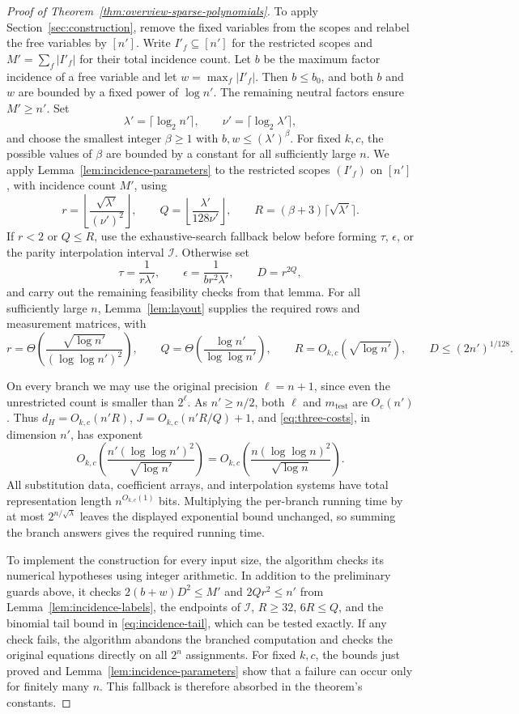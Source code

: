 \documentclass[11pt,reqno]{amsart}
\numberwithin{equation}{section}
\theoremstyle{definition}\newtheorem{definition}[theorem]{Definition}
\theoremstyle{remark}\newtheorem{remark}[theorem]{Remark}
\renewcommand{\le}{\leqslant}
\renewcommand{\ge}{\geqslant}
\begin{document}
\begin{proof}[Proof of Theorem~\ref{thm:overview-sparse-polynomials}]
To apply Section~\ref{sec:construction}, remove the fixed variables from the
scopes and relabel the free variables by $[n']$.
Write $I'_f\subseteq[n']$ for the restricted
scopes and $M'=\sum_f|I'_f|$ for their total incidence count.
Let $b$ be the maximum factor incidence of a free variable
and let $w=\max_f|I'_f|$. Then $b\le b_0$,
and both $b$ and $w$ are bounded by a fixed power of $\log n'$.
The remaining neutral factors ensure $M'\ge n'$.
Set
\[
 \lambda'=\lceil\log_2 n'\rceil,\qquad
 \nu'=\lceil\log_2\lambda'\rceil,
\]
and choose the smallest integer $\beta\ge1$ with
$b,w\le(\lambda')^\beta$. For fixed $k,c$, the possible values
of $\beta$ are bounded by a constant for all sufficiently large
$n$. We apply Lemma~\ref{lem:incidence-parameters} to the restricted
scopes $(I'_f)$ on $[n']$, with incidence count $M'$, using
\[
 r=\left\lfloor\frac{\sqrt{\lambda'}}{(\nu')^2}\right\rfloor,
 \qquad Q=\left\lfloor\frac{\lambda'}{128\nu'}\right\rfloor,
 \qquad R=(\beta+3)\lceil\sqrt{\lambda'}\rceil.
\]
If $r<2$ or $Q\le R$, use the exhaustive-search fallback below
before forming $\tau$, $\epsilon$, or the parity interpolation
interval $\mathcal I$.
Otherwise set
\[
 \tau=\frac1{r\lambda'},\qquad
 \epsilon=\frac1{br^2\lambda'},\qquad D=r^{2Q},
\]
and carry out the remaining feasibility checks from that lemma.
For all sufficiently large $n$, Lemma~\ref{lem:layout} supplies
the required rows and measurement matrices, with
\[
 r=\Theta\!\left(\frac{\sqrt{\log n'}}{(\log\log n')^2}\right),
 \qquad Q=\Theta\!\left(\frac{\log n'}{\log\log n'}\right),
 \qquad R=O_{k,c}(\sqrt{\log n'}),
 \qquad D\le(2n')^{1/128}.
\]

On every branch we may use the original precision $\ell=n+1$,
since even the unrestricted count is smaller than $2^\ell$. As
$n'\ge n/2$, both $\ell$ and $m_{\mathrm{test}}$ are $O_c(n')$.
Thus $d_H=O_{k,c}(n'R)$, $J=O_{k,c}(n'R/Q)+1$, and
\eqref{eq:three-costs}, in dimension $n'$, has exponent
\[
 O_{k,c}\!\left(\frac{n'(\log\log n')^2}{\sqrt{\log n'}}\right)
 =O_{k,c}\!\left(\frac{n(\log\log n)^2}{\sqrt{\log n}}\right).
\]
All substitution data, coefficient arrays, and interpolation systems
have total representation length $n^{O_{k,c}(1)}$ bits.
Multiplying the per-branch running time by at most
$2^{n/\sqrt\lambda}$ leaves the displayed exponential bound
unchanged, so summing the branch answers gives the required running time.

To implement the construction for every input size, the algorithm
checks its numerical hypotheses using integer arithmetic.
In addition to the preliminary guards above, it checks
$2(b+w)D^2\le M'$ and $2Qr^2\le n'$ from
Lemma~\ref{lem:incidence-labels}, the endpoints of $\mathcal I$,
$R\ge32$, $6R\le Q$, and the binomial tail bound in
\eqref{eq:incidence-tail}, which can be tested exactly.
If any check fails, the algorithm abandons the branched computation
and checks the original equations directly on all $2^n$ assignments. For fixed
$k,c$, the bounds just proved and
Lemma~\ref{lem:incidence-parameters} show that a failure can occur
only for finitely many $n$. This fallback is therefore absorbed
in the theorem's constants.


\end{proof}
\end{document}
